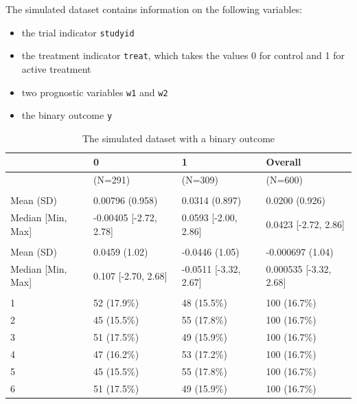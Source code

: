 \documentclass[
  letterpaper,
  DIV=11,
  numbers=noendperiod]{scrreprt}
\providecommand{\tightlist}{%
  \setlength{\itemsep}{0pt}\setlength{\parskip}{0pt}}\usepackage{longtable,booktabs,array}
\begin{document}
The simulated dataset contains information on the following variables:

\begin{itemize}
\tightlist
\item
  the trial indicator \texttt{studyid}
\item
  the treatment indicator \texttt{treat}, which takes the values 0 for
  control and 1 for active treatment
\item
  two prognostic variables \texttt{w1} and \texttt{w2}
\item
  the binary outcome \texttt{y}
\end{itemize}

\hypertarget{tbl-summary-binary_outcome-data}{}
\begin{table}
\caption{\label{tbl-summary-binary_outcome-data}The simulated dataset with a binary outcome }\tabularnewline

\centering
\begin{tabular}[t]{llll}
\toprule
  & 0 & 1 & Overall\\
\midrule
 & (N=291) & (N=309) & (N=600)\\
\addlinespace[0.3em]
\multicolumn{4}{l}{\textbf{w1}}\\
\hspace{1em}Mean (SD) & 0.00796 (0.958) & 0.0314 (0.897) & 0.0200 (0.926)\\
\hspace{1em}Median [Min, Max] & -0.00405 [-2.72, 2.78] & 0.0593 [-2.00, 2.86] & 0.0423 [-2.72, 2.86]\\
\addlinespace[0.3em]
\multicolumn{4}{l}{\textbf{w2}}\\
\hspace{1em}Mean (SD) & 0.0459 (1.02) & -0.0446 (1.05) & -0.000697 (1.04)\\
\hspace{1em}Median [Min, Max] & 0.107 [-2.70, 2.68] & -0.0511 [-3.32, 2.67] & 0.000535 [-3.32, 2.68]\\
\addlinespace[0.3em]
\multicolumn{4}{l}{\textbf{studyid}}\\
\hspace{1em}1 & 52 (17.9\%) & 48 (15.5\%) & 100 (16.7\%)\\
\hspace{1em}2 & 45 (15.5\%) & 55 (17.8\%) & 100 (16.7\%)\\
\hspace{1em}3 & 51 (17.5\%) & 49 (15.9\%) & 100 (16.7\%)\\
\hspace{1em}4 & 47 (16.2\%) & 53 (17.2\%) & 100 (16.7\%)\\
\hspace{1em}5 & 45 (15.5\%) & 55 (17.8\%) & 100 (16.7\%)\\
\hspace{1em}6 & 51 (17.5\%) & 49 (15.9\%) & 100 (16.7\%)\\
\bottomrule
\end{tabular}
\end{table}
\end{document}
